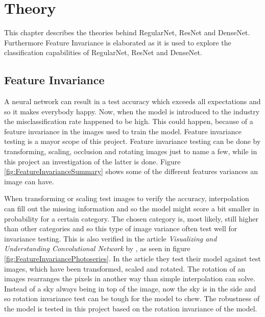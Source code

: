 \chapter{Theory}
\label{chp:theory}

This chapter describes the theories behind RegularNet, ResNet and DenseNet. Furthermore Feature Invariance is elaborated as it is used to explore the classification capabilities of RegularNet, ResNet and DenseNet.

\section{Feature Invariance}
A neural network can result in a test accuracy which exceeds all expectations and so it makes everybody happy. Now, when the model is introduced to the industry the misclassification rate happened to be high. This could happen, because of a feature invariance in the images used to train the model. Feature invariance testing is a mayor scope of this project. Feature invariance testing can be done by transforming, scaling, occlusion and rotating images just to name a few, while in this project an investigation of the latter is done. Figure \ref{fig:FeatureInvarianceSummary} shows some of the different features variances an image can have.

\FloatBarrier

When transforming or scaling test images to verify the accuracy, interpolation can fill out the missing information and so the model might score a bit smaller in probability for a certain category. The chosen category is, most likely, still higher than other categories and so this type of image variance often test well for invariance testing. This is also verified in the article \textit{Visualizing and Understanding Convolutional Network} by \citet{Visualizing}, as seen in figure \ref{fig:FeatureInvariancePhotoseries}. In the article they test their model against test images, which have been transformed, scaled and rotated. The rotation of an images rearranges the pixels in another way than simple interpolation can solve. Instead of a sky always being in top of the image, now the sky is in the side and so rotation invariance test can be tough for the model to chew. The robustness of the model is tested in this project based on the rotation invariance of the model.

\FloatBarrier






